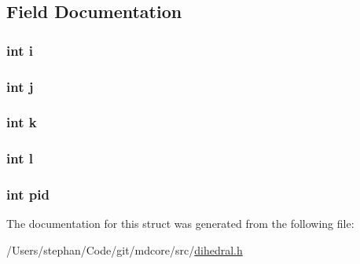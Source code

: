 \subsection{Field Documentation}
\hypertarget{structdihedral_acb559820d9ca11295b4500f179ef6392}{
\subsubsection[{i}]{\setlength{\rightskip}{0pt plus 5cm}int i}}\label{structdihedral_acb559820d9ca11295b4500f179ef6392}
\hypertarget{structdihedral_a37d972ae0b47b9099e30983131d31916}{
\subsubsection[{j}]{\setlength{\rightskip}{0pt plus 5cm}int j}}\label{structdihedral_a37d972ae0b47b9099e30983131d31916}
\hypertarget{structdihedral_ab66ed8e0098c0a86b458672a55a9cca9}{
\subsubsection[{k}]{\setlength{\rightskip}{0pt plus 5cm}int k}}\label{structdihedral_ab66ed8e0098c0a86b458672a55a9cca9}
\hypertarget{structdihedral_a89606eca6b563ec68d2da2e84657736f}{
\subsubsection[{l}]{\setlength{\rightskip}{0pt plus 5cm}int l}}\label{structdihedral_a89606eca6b563ec68d2da2e84657736f}
\hypertarget{structdihedral_af500917c052066b40cf47f96b43c607b}{
\subsubsection[{pid}]{\setlength{\rightskip}{0pt plus 5cm}int pid}}\label{structdihedral_af500917c052066b40cf47f96b43c607b}


The documentation for this struct was generated from the following file\-:\begin{DoxyCompactItemize}
\item 
/\-Users/stephan/\-Code/git/mdcore/src/\hyperlink{dihedral_8h}{dihedral.\-h}\end{DoxyCompactItemize}
